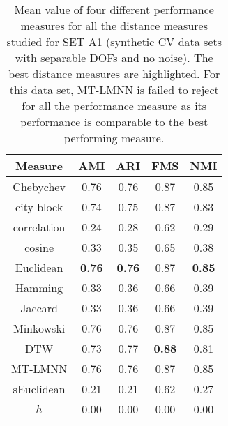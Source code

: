 \begin{table}[h]
     \centering
    \begin{tabular}{ |c|c|c|c|c| }
      \hline
    Measure    & 	 AMI &	 ARI &	 FMS &	 NMI \\
    \hline
    Chebychev & 	 0.76 &	 0.76 &	 0.87 &	0.85 \\
    city block  &	 0.74 &	 0.75 &	 0.87 &	0.83  \\
    correlation &	 0.24 	& 0.28 &	 0.62 &	0.29 \\
    cosine    & 	 0.33 &	 0.35 &	 0.65 &	0.38 \\
    Euclidean & 	 \textbf{0.76} 	& \textbf{0.76} 	& 0.87 &	\textbf{0.85} \\
    Hamming    &	 0.33 &	 0.36 &	 0.66 &	0.39 \\
    Jaccard   & 	 0.33 &	 0.36 &	 0.66 &	0.39 \\
    Minkowski & 	 0.76 &	 0.76 &	 0.87 &	0.85 \\
    DTW       & 	 0.73 &	 0.77 &	 \textbf{0.88} &	0.81 \\
    MT-LMNN  &  	 0.76 &	 0.76 	& 0.87 &	0.85 \\
    sEuclidean &	 0.21 &	 0.21 	& 0.62 &	0.27 \\
    \hline
    $h$   &  	 0.00 &	 0.00 &	 0.00 &	0.00 \\
    \hline
    \end{tabular}
    \captionsetup{justification=centering}
     \caption{Mean value of four different performance measures for all the distance measures studied for SET A1 (synthetic CV data sets with separable DOFs and no noise). The best distance measures are highlighted. For this data set, MT-LMNN is failed to reject for all the performance measure as its performance is comparable to the best performing measure. }
     \label{ttest_seta1}
 \end{table}
 
